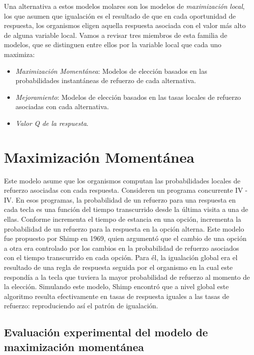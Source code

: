 \documentclass[
  letterpaper,
]{book}
\providecommand{\tightlist}{%
  \setlength{\itemsep}{0pt}\setlength{\parskip}{0pt}}\usepackage{longtable,booktabs,array}
\begin{document}
Una alternativa a estos modelos molares son los modelos de
\emph{maximización local}, los que asumen que igualación es el resultado
de que en cada oportunidad de respuesta, los organismos eligen aquella
respuesta asociada con el valor más alto de alguna variable local. Vamos
a revisar tres miembros de esta familia de modelos, que se distinguen
entre ellos por la variable local que cada uno maximiza:

\begin{itemize}
\tightlist
\item
  \emph{Maximización Momentánea}: Modelos de elección basados en las
  probabilidades instantáneas de refuerzo de cada alternativa.
\item
  \emph{Mejoramiento}: Modelos de elección basados en las tasas locales
  de refuerzo asociadas con cada alternativa.
\item
  \emph{Valor Q de la respuesta}.
\end{itemize}

\section{Maximización Momentánea}\label{maximizaciuxf3n-momentuxe1nea}

Este modelo asume que los organismos computan las probabilidades locales
de refuerzo asociadas con cada respuesta. Consideren un programa
concurrente IV - IV. En esos programas, la probabilidad de un refuerzo
para una respuesta en cada tecla es una función del tiempo transcurrido
desde la última visita a una de ellas. Conforme incrementa el tiempo de
estancia en una opción, incrementa la probabilidad de un refuerzo para
la respuesta en la opción alterna. Este modelo fue propuesto por Shimp
en 1969, quien argumentó que el cambio de una opción a otra era
controlado por los cambios en la probabilidad de refuerzo asociados con
el tiempo transcurrido en cada opción. Para él, la igualación global era
el resultado de una regla de respuesta seguida por el organismo en la
cual este respondía a la tecla que tuviera la mayor probabilidad de
refuerzo al momento de la elección. Simulando este modelo, Shimp
encontró que a nivel global este algoritmo resulta efectivamente en
tasas de respuesta iguales a las tasas de refuerzo: reproduciendo así el
patrón de igualación.

\subsection{Evaluación experimental del modelo de maximización
momentánea}\label{evaluaciuxf3n-experimental-del-modelo-de-maximizaciuxf3n-momentuxe1nea}
\end{document}
